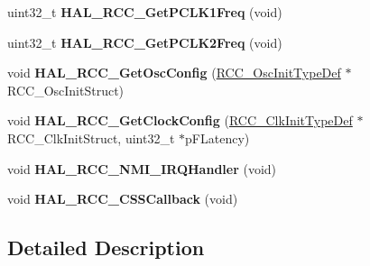 \begin{DoxyCompactItemize}
uint32\+\_\+t {\bfseries H\+A\+L\+\_\+\+R\+C\+C\+\_\+\+Get\+P\+C\+L\+K1\+Freq} (void)
\item 
\mbox{\label{group___r_c_c___exported___functions___group2_gabbd5f8933a5ee05e4b3384e33026aca1}} 
uint32\+\_\+t {\bfseries H\+A\+L\+\_\+\+R\+C\+C\+\_\+\+Get\+P\+C\+L\+K2\+Freq} (void)
\item 
\mbox{\label{group___r_c_c___exported___functions___group2_gae2f9413fc447c2d7d6af3a8669c77b36}} 
void {\bfseries H\+A\+L\+\_\+\+R\+C\+C\+\_\+\+Get\+Osc\+Config} (\hyperlink{struct_r_c_c___osc_init_type_def}{R\+C\+C\+\_\+\+Osc\+Init\+Type\+Def} $\ast$R\+C\+C\+\_\+\+Osc\+Init\+Struct)
\item 
\mbox{\label{group___r_c_c___exported___functions___group2_gabc95375dfca279d88b9ded9d063d2323}} 
void {\bfseries H\+A\+L\+\_\+\+R\+C\+C\+\_\+\+Get\+Clock\+Config} (\hyperlink{struct_r_c_c___clk_init_type_def}{R\+C\+C\+\_\+\+Clk\+Init\+Type\+Def} $\ast$R\+C\+C\+\_\+\+Clk\+Init\+Struct, uint32\+\_\+t $\ast$p\+F\+Latency)
\item 
\mbox{\label{group___r_c_c___exported___functions___group2_ga0c124cf403362750513cae7fb6e6b195}} 
void {\bfseries H\+A\+L\+\_\+\+R\+C\+C\+\_\+\+N\+M\+I\+\_\+\+I\+R\+Q\+Handler} (void)
\item 
\mbox{\label{group___r_c_c___exported___functions___group2_gaa05b9157de5a48617bd06eb6aafa68aa}} 
void {\bfseries H\+A\+L\+\_\+\+R\+C\+C\+\_\+\+C\+S\+S\+Callback} (void)
\end{DoxyCompactItemize}


\subsection{Detailed Description}
